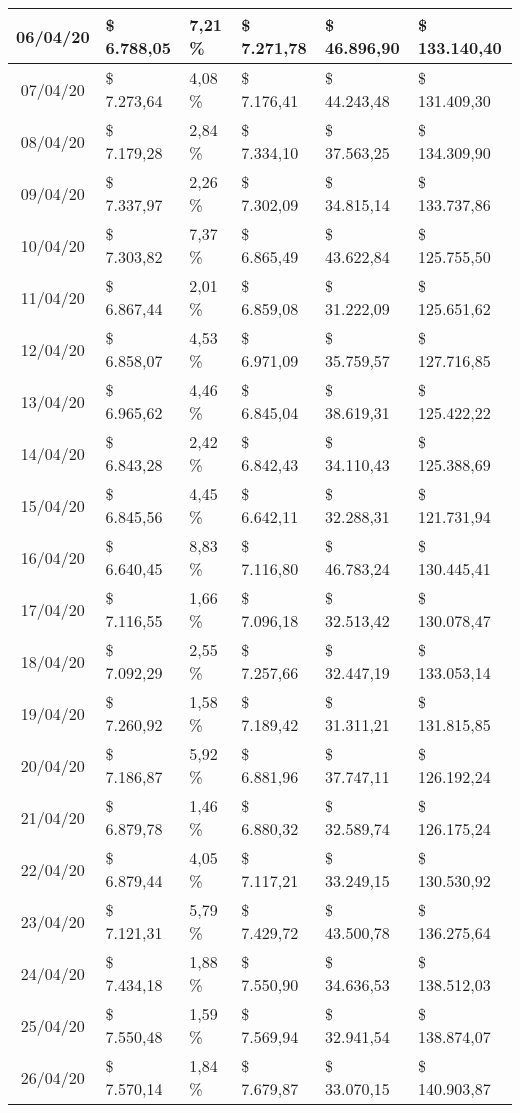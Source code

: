 \begin{small}
\begin{longtable}{|c|l|l|l|l|l|}
06/04/20 & \$ 6.788,05 & 7,21 \% & \$ 7.271,78 & \$ 46.896,90 & \$ 133.140,40 \\ \hline
07/04/20 & \$ 7.273,64 & 4,08 \% & \$ 7.176,41 & \$ 44.243,48 & \$ 131.409,30 \\ \hline
08/04/20 & \$ 7.179,28 & 2,84 \% & \$ 7.334,10 & \$ 37.563,25 & \$ 134.309,90 \\ \hline
09/04/20 & \$ 7.337,97 & 2,26 \% & \$ 7.302,09 & \$ 34.815,14 & \$ 133.737,86 \\ \hline
10/04/20 & \$ 7.303,82 & 7,37 \% & \$ 6.865,49 & \$ 43.622,84 & \$ 125.755,50 \\ \hline
11/04/20 & \$ 6.867,44 & 2,01 \% & \$ 6.859,08 & \$ 31.222,09 & \$ 125.651,62 \\ \hline
12/04/20 & \$ 6.858,07 & 4,53 \% & \$ 6.971,09 & \$ 35.759,57 & \$ 127.716,85 \\ \hline
13/04/20 & \$ 6.965,62 & 4,46 \% & \$ 6.845,04 & \$ 38.619,31 & \$ 125.422,22 \\ \hline
14/04/20 & \$ 6.843,28 & 2,42 \% & \$ 6.842,43 & \$ 34.110,43 & \$ 125.388,69 \\ \hline
15/04/20 & \$ 6.845,56 & 4,45 \% & \$ 6.642,11 & \$ 32.288,31 & \$ 121.731,94 \\ \hline
16/04/20 & \$ 6.640,45 & 8,83 \% & \$ 7.116,80 & \$ 46.783,24 & \$ 130.445,41 \\ \hline
17/04/20 & \$ 7.116,55 & 1,66 \% & \$ 7.096,18 & \$ 32.513,42 & \$ 130.078,47 \\ \hline
18/04/20 & \$ 7.092,29 & 2,55 \% & \$ 7.257,66 & \$ 32.447,19 & \$ 133.053,14 \\ \hline
19/04/20 & \$ 7.260,92 & 1,58 \% & \$ 7.189,42 & \$ 31.311,21 & \$ 131.815,85 \\ \hline
20/04/20 & \$ 7.186,87 & 5,92 \% & \$ 6.881,96 & \$ 37.747,11 & \$ 126.192,24 \\ \hline
21/04/20 & \$ 6.879,78 & 1,46 \% & \$ 6.880,32 & \$ 32.589,74 & \$ 126.175,24 \\ \hline
22/04/20 & \$ 6.879,44 & 4,05 \% & \$ 7.117,21 & \$ 33.249,15 & \$ 130.530,92 \\ \hline
23/04/20 & \$ 7.121,31 & 5,79 \% & \$ 7.429,72 & \$ 43.500,78 & \$ 136.275,64 \\ \hline
24/04/20 & \$ 7.434,18 & 1,88 \% & \$ 7.550,90 & \$ 34.636,53 & \$ 138.512,03 \\ \hline
25/04/20 & \$ 7.550,48 & 1,59 \% & \$ 7.569,94 & \$ 32.941,54 & \$ 138.874,07 \\ \hline
26/04/20 & \$ 7.570,14 & 1,84 \% & \$ 7.679,87 & \$ 33.070,15 & \$ 140.903,87 \\ \hline

\end{longtable}
\end{small}
